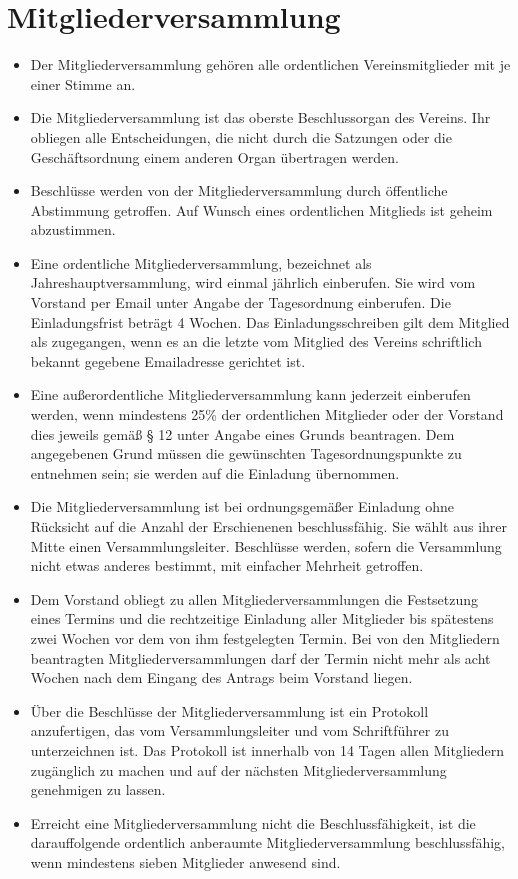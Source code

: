 \documentclass[a4paper,10pt]{article}
\begin{document}
\section{Mitgliederversammlung}
  \begin{itemize}
   \item Der Mitgliederversammlung gehören alle ordentlichen Vereinsmitglieder mit je einer Stimme an. 
   \item Die Mitgliederversammlung ist das oberste Beschlussorgan des Vereins. Ihr obliegen alle Entscheidungen, die nicht durch die Satzungen oder die Geschäftsordnung einem anderen Organ übertragen werden.
   \item Beschlüsse werden von der Mitgliederversammlung durch öffentliche Abstimmung getroffen. Auf Wunsch eines ordentlichen Mitglieds ist geheim abzustimmen.
   \item Eine ordentliche Mitgliederversammlung, bezeichnet als Jahreshauptversammlung, wird einmal jährlich einberufen. Sie wird vom Vorstand per Email unter Angabe der Tagesordnung einberufen. Die Einladungsfrist beträgt 4 Wochen. Das Einladungsschreiben gilt dem Mitglied als zugegangen, wenn es an die letzte vom Mitglied des Vereins schriftlich bekannt gegebene Emailadresse gerichtet ist. 
   \item Eine außerordentliche Mitgliederversammlung kann jederzeit einberufen werden, wenn mindestens 25\% der ordentlichen Mitglieder oder der Vorstand dies jeweils gemäß § 12 unter Angabe eines Grunds beantragen. Dem angegebenen Grund müssen die gewünschten Tagesordnungspunkte zu entnehmen sein; sie werden auf die Einladung übernommen.
   \item Die Mitgliederversammlung ist bei ordnungsgemäßer Einladung ohne Rücksicht auf die Anzahl der Erschienenen beschlussfähig. Sie wählt aus ihrer Mitte einen Versammlungsleiter. Beschlüsse werden, sofern die Versammlung nicht etwas anderes bestimmt, mit einfacher Mehrheit getroffen. 
   \item Dem Vorstand obliegt zu allen Mitgliederversammlungen die Festsetzung eines Termins und die rechtzeitige Einladung aller Mitglieder bis spätestens zwei Wochen vor dem von ihm festgelegten Termin. Bei von den Mitgliedern beantragten Mitgliederversammlungen darf der Termin nicht mehr als acht Wochen nach dem Eingang des Antrags beim Vorstand liegen.
   \item Über die Beschlüsse der Mitgliederversammlung ist ein Protokoll anzufertigen, das vom Versammlungsleiter und vom Schriftführer zu unterzeichnen ist. Das Protokoll ist innerhalb von 14 Tagen allen Mitgliedern zugänglich zu machen und auf der nächsten Mitgliederversammlung genehmigen zu lassen.
   \item Erreicht eine Mitgliederversammlung nicht die Beschlussfähigkeit, ist die darauffolgende ordentlich anberaumte Mitgliederversammlung beschlussfähig, wenn mindestens sieben Mitglieder anwesend sind.
  \end{itemize}
  
\end{document}
